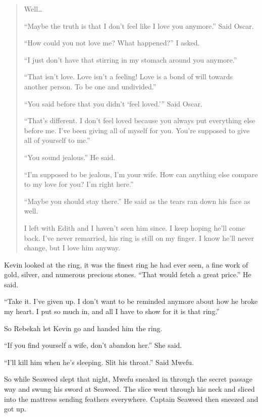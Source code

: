 \begin{quote}

Well\ldots

``Maybe the truth is that I don't feel like I love you anymore.'' Said Oscar.

``How could you not love me? What happened?'' I asked.

``I just don't have that stirring in my stomach around you anymore.''

``That isn't love. Love isn't a feeling! Love is a bond of will towards another person. To be one and undivided.''

``You said before that you didn't `feel loved.''' Said Oscar.

``That's different. I don't feel loved because you always put everything else before me. I've been giving all of myself for you. You're supposed to give all of yourself to me.''

``You sound jealous.'' He said.

``I'm supposed to be jealous, I'm your wife. How can anything else compare to my love for you? I'm right here.''

``Maybe you should stay there.'' He said as the tears ran down his face as well.

I left with Edith and I haven't seen him since. I keep hoping he'll come back. I've never remarried, his ring is still on my finger. I know he'll never change, but I love him anyway.

\end{quote}

Kevin looked at the ring, it was the finest ring he had ever seen, a fine work of gold, silver, and numerous precious stones.
``That would fetch a great price.'' He said.

``Take it. I've given up. I don't want to be reminded anymore about how he broke my heart. I put so much in, and all I have to show for it is that ring.''

So Rebekah let Kevin go and handed him the ring.

``If you find yourself a wife, don't abandon her.'' She said.

\tbreak

``I'll kill him when he's sleeping. Slit his throat.'' Said Mwefu.

So while Seaweed slept that night, Mwefu sneaked in through the secret passage way and swung his sword at Seaweed. The slice went through his neck and sliced into the mattress sending feathers everywhere. Captain Seaweed then sneezed and got up.

